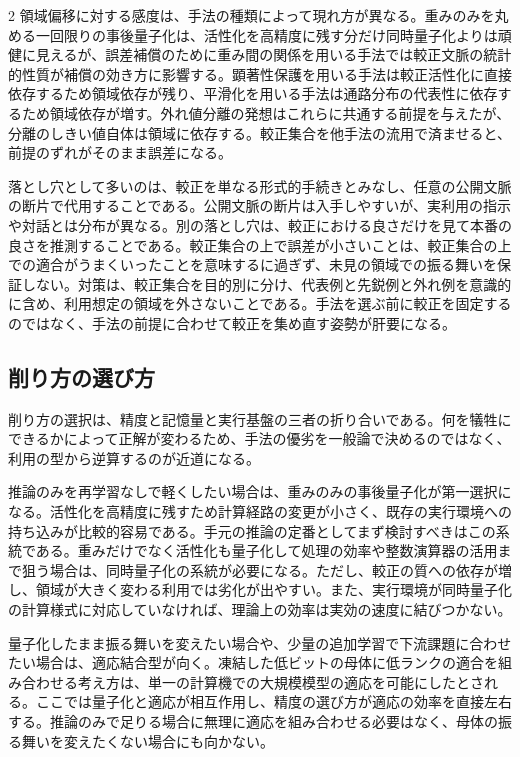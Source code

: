 \documentclass[lualatex,a4paper,10pt]{jlreq}
\begin{document}
\begin{multicols}{2}
領域偏移に対する感度は、手法の種類によって現れ方が異なる。重みのみを丸める一回限りの事後量子化は、活性化を高精度に残す分だけ同時量子化よりは頑健に見えるが、誤差補償のために重み間の関係を用いる手法では較正文脈の統計的性質が補償の効き方に影響する\autocite{gptq}。顕著性保護を用いる手法は較正活性化に直接依存するため領域依存が残り\autocite{awq}、平滑化を用いる手法は通路分布の代表性に依存するため領域依存が増す\autocite{smoothquant}。外れ値分離の発想はこれらに共通する前提を与えたが、分離のしきい値自体は領域に依存する\autocite{llmint8}。較正集合を他手法の流用で済ませると、前提のずれがそのまま誤差になる。

落とし穴として多いのは、較正を単なる形式的手続きとみなし、任意の公開文脈の断片で代用することである。公開文脈の断片は入手しやすいが、実利用の指示や対話とは分布が異なる。別の落とし穴は、較正における良さだけを見て本番の良さを推測することである。較正集合の上で誤差が小さいことは、較正集合の上での適合がうまくいったことを意味するに過ぎず、未見の領域での振る舞いを保証しない。対策は、較正集合を目的別に分け、代表例と先鋭例と外れ例を意識的に含め、利用想定の領域を外さないことである。手法を選ぶ前に較正を固定するのではなく、手法の前提に合わせて較正を集め直す姿勢が肝要になる。

\subsection{削り方の選び方}
削り方の選択は、精度と記憶量と実行基盤の三者の折り合いである。何を犠牲にできるかによって正解が変わるため、手法の優劣を一般論で決めるのではなく、利用の型から逆算するのが近道になる。

推論のみを再学習なしで軽くしたい場合は、重みのみの事後量子化が第一選択になる。活性化を高精度に残すため計算経路の変更が小さく、既存の実行環境への持ち込みが比較的容易である。手元の推論の定番としてまず検討すべきはこの系統である。重みだけでなく活性化も量子化して処理の効率や整数演算器の活用まで狙う場合は、同時量子化の系統が必要になる。ただし、較正の質への依存が増し、領域が大きく変わる利用では劣化が出やすい。また、実行環境が同時量子化の計算様式に対応していなければ、理論上の効率は実効の速度に結びつかない。

量子化したまま振る舞いを変えたい場合や、少量の追加学習で下流課題に合わせたい場合は、適応結合型が向く。凍結した低ビットの母体に低ランクの適合を組み合わせる考え方は、単一の計算機での大規模模型の適応を可能にしたとされる\autocite{qlora}。ここでは量子化と適応が相互作用し、精度の選び方が適応の効率を直接左右する。推論のみで足りる場合に無理に適応を組み合わせる必要はなく、母体の振る舞いを変えたくない場合にも向かない。


\end{multicols}
\end{document}
